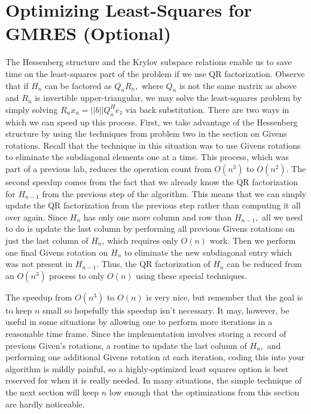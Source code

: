 \section*{Optimizing Least-Squares for GMRES (Optional)}
The Hessenberg structure and the Krylov subspace relations enable us to save time on the least-squares part of the problem if we use QR factorization.
Observe that if $H_n$ can be factored as $Q_nR_n,$ where $Q_n$ is not the same matrix as above and $R_n$ is invertible upper-triangular, we may solve the least-squares problem by simply solving $R_nx_n=||b||Q_n^He_1$ via back substitution.
There are two ways in which we can speed up this process.
First, we take advantage of the Hessenberg structure by using the techniques from problem two in the section on Givens rotations.
Recall that the technique in this situation was to use Givens rotations to eliminate the subdiagonal elements one at a time.
This process, which was part of a previous lab, reduces the operation count from $O(n^3)$ to $O(n^2)$.
The second speedup comes from the fact that we already know the QR factorization for $H_{n-1}$ from the previous step of the algorithm.
This means that we can simply update the QR factorization from the previous step rather than computing it all over again.
Since $H_{n}$ has only one more column and row than $H_{n-1},$ all we need to do is update the last column by performing all previous Givens rotations on just the last column of $H_n$, which requires only $O(n)$ work.
Then we perform one final Givens rotation on $H_n$ to eliminate the new subdiagonal entry which was not present in $H_{n-1}.$
Thus, the QR factorization of $H_n$ can be reduced from an $O(n^3)$ process to only $O(n)$ using these special techniques.

The speedup from $O(n^3)$ to $O(n)$ is very nice, but remember that the goal is to keep $n$ small so hopefully this speedup isn't necessary.
It may, however, be useful in some situations by allowing one to perform more iterations in a reasonable time frame.
Since the implementation involves storing a record of previous Given's rotations, a routine to update the last column of $H_n,$ and performing one additional Givens rotation at each iteration, coding this into your algorithm is mildly painful, so a highly-optimized least squares option is best reserved for when it is really needed.
In many situations, the simple technique of the next section will keep $n$ low enough that the optimizations from this section are hardly noticeable.
%

